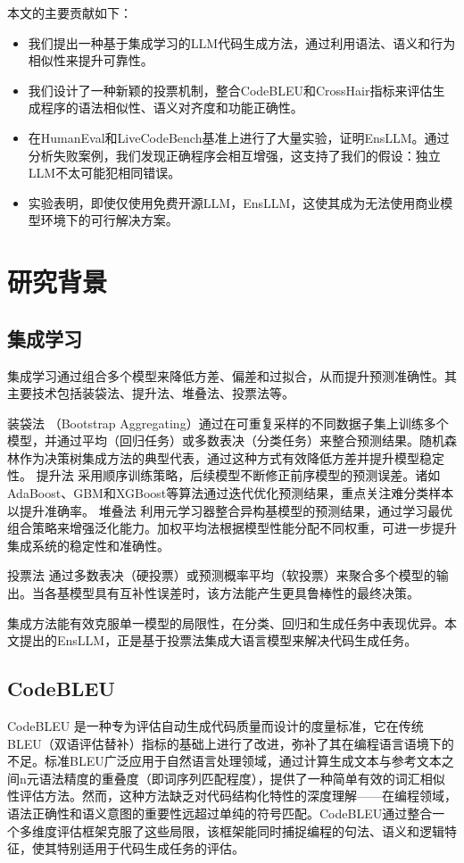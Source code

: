 \documentclass{article}
\newcommand{\tool}{EnsLLM}
\begin{document}
\begin{CJK*}{UTF8}{gbsn}
本文的主要贡献如下：
\begin{itemize}
    \item 我们提出一种基于集成学习的LLM代码生成方法，通过利用语法、语义和行为相似性来提升可靠性。
    \item 我们设计了一种新颖的投票机制，整合CodeBLEU和CrossHair指标来评估生成程序的语法相似性、语义对齐度和功能正确性。
    \item 在HumanEval和LiveCodeBench基准上进行了大量实验，证明\tool{}。通过分析失败案例，我们发现正确程序会相互增强，这支持了我们的假设：独立LLM不太可能犯相同错误。
    \item 实验表明，即使仅使用免费开源LLM，\tool{}，这使其成为无法使用商业模型环境下的可行解决方案。
\end{itemize}
\section{研究背景}


\subsection{集成学习}
集成学习通过组合多个模型来降低方差、偏差和过拟合，从而提升预测准确性。其主要技术包括装袋法、提升法、堆叠法、投票法等。

装袋法 \cite{bagging}（Bootstrap Aggregating）通过在可重复采样的不同数据子集上训练多个模型，并通过平均（回归任务）或多数表决（分类任务）来整合预测结果。随机森林作为决策树集成方法的典型代表，通过这种方式有效降低方差并提升模型稳定性。
提升法 \cite{boosting} 采用顺序训练策略，后续模型不断修正前序模型的预测误差。诸如AdaBoost、GBM和XGBoost等算法通过迭代优化预测结果，重点关注难分类样本以提升准确率。
堆叠法 \cite{stacking} 利用元学习器整合异构基模型的预测结果，通过学习最优组合策略来增强泛化能力。加权平均法根据模型性能分配不同权重，可进一步提升集成系统的稳定性和准确性。

投票法 \cite{kittler1998combining} 通过多数表决（硬投票）或预测概率平均（软投票）来聚合多个模型的输出。当各基模型具有互补性误差时，该方法能产生更具鲁棒性的最终决策。

集成方法能有效克服单一模型的局限性，在分类、回归和生成任务中表现优异。本文提出的\tool{}，正是基于投票法集成大语言模型来解决代码生成任务。
\subsection{CodeBLEU}
CodeBLEU \cite{codebleu} 是一种专为评估自动生成代码质量而设计的度量标准，它在传统BLEU（双语评估替补）指标的基础上进行了改进，弥补了其在编程语言语境下的不足。标准BLEU广泛应用于自然语言处理领域，通过计算生成文本与参考文本之间n元语法精度的重叠度（即词序列匹配程度），提供了一种简单有效的词汇相似性评估方法。然而，这种方法缺乏对代码结构化特性的深度理解——在编程领域，语法正确性和语义意图的重要性远超过单纯的符号匹配。CodeBLEU通过整合一个多维度评估框架克服了这些局限，该框架能同时捕捉编程的句法、语义和逻辑特征，使其特别适用于代码生成任务的评估。


\end{CJK*}
\end{document}
